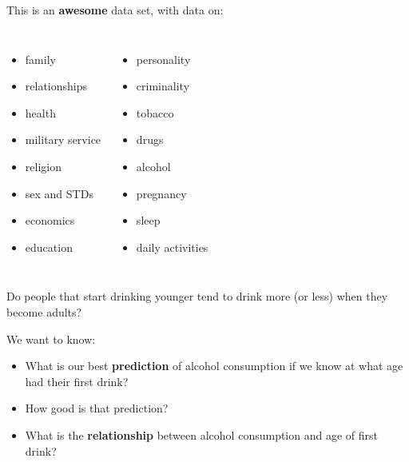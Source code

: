 \documentclass{beamer}\usepackage[]{graphicx}\usepackage[]{color}
\begin{document}
\begin{darkframes}
    \begin{frame}
      This is an \textbf{awesome} data set, with data on:
      \begin{columns}[onlytextwidth]
          \begin{itemize}
            \item family
            \item relationships
            \item health
            \item military service
            \item religion
            \item sex and STDs
            \item economics
            \item education
          \end{itemize}
          \begin{itemize}
            \item personality
            \item criminality
            \item tobacco
            \item drugs
            \item alcohol
            \item pregnancy
            \item sleep
            \item daily activities
          \end{itemize}
      \end{columns}
    \end{frame}

    \begin{frame}
      \begin{center}
        Do people that start drinking younger tend to drink more (or less) when they become adults?
      \end{center}
      \bigskip\pause
      We want to know:
      \begin{itemize}[<+->]
        \item What is our best \textbf{prediction} of alcohol consumption if we know at what age had their first drink?
        \item How good is that prediction?
        \item What is the \textbf{relationship} between alcohol consumption and age of first drink?
      \end{itemize}
    \end{frame}


\end{darkframes}
\end{document}
